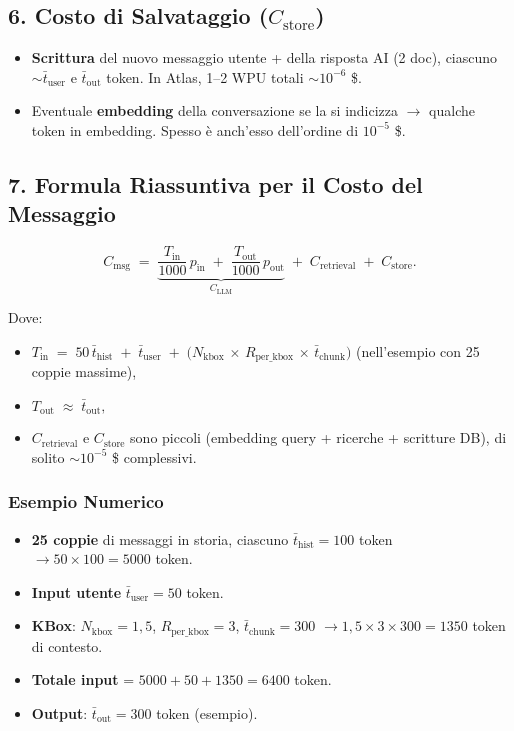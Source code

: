 \documentclass{article}
\begin{document}
\subsection*{6. Costo di Salvataggio (\(C_{\text{store}}\))}
\begin{itemize}
    \item \textbf{Scrittura} del nuovo messaggio utente + della risposta AI (2 doc), ciascuno $\sim \bar{t}_{\text{user}}$ e $\bar{t}_{\text{out}}$ token. In Atlas, 1--2 WPU totali $\sim 10^{-6}$ \$.
    \item Eventuale \textbf{embedding} della conversazione se la si indicizza $\rightarrow$ qualche token in embedding. Spesso è anch'esso dell'ordine di $10^{-5}$ \$.
\end{itemize}

\subsection*{7. Formula Riassuntiva per il Costo del Messaggio}

\[
\boxed{
C_{\text{msg}}
\;=\;
\underbrace{\frac{T_{\text{in}}}{1000}\,p_{\text{in}}
\;+\;
\frac{T_{\text{out}}}{1000}\,p_{\text{out}}}_{C_{\text{LLM}}}
\;+\;
C_{\text{retrieval}}
\;+\;
C_{\text{store}}.
}
\]

Dove:
\begin{itemize}
    \item \(\displaystyle T_{\text{in}} \;=\; 50\,\bar{t}_{\text{hist}} \;+\; \bar{t}_{\text{user}} \;+\; \bigl(N_{\text{kbox}}\,\times\,R_{\text{per\_kbox}}\,\times\,\bar{t}_{\text{chunk}}\bigr)\) (nell'esempio con 25 coppie massime),
    \item \(\displaystyle T_{\text{out}} \;\approx\; \bar{t}_{\text{out}},\)
    \item \(C_{\text{retrieval}}\) e \(C_{\text{store}}\) sono piccoli (embedding query + ricerche + scritture DB), di solito $\sim 10^{-5}$ \$ complessivi.
\end{itemize}

\subsubsection*{Esempio Numerico}
\begin{itemize}
    \item \textbf{25 coppie} di messaggi in storia, ciascuno $\bar{t}_{\text{hist}} = 100$ token $\rightarrow 50 \times 100 = 5000$ token.
    \item \textbf{Input utente} $\bar{t}_{\text{user}} = 50$ token.
    \item \textbf{KBox}: $N_{\text{kbox}} = 1,5$, $R_{\text{per\_kbox}}=3$, $\bar{t}_{\text{chunk}} = 300$ $\rightarrow 1,5 \times 3 \times 300 = 1350$ token di contesto.
    \item \textbf{Totale input} = $5000 + 50 + 1350 = 6400$ token.
    \item \textbf{Output}: $\bar{t}_{\text{out}} = 300$ token (esempio).
\end{itemize}
\end{document}
